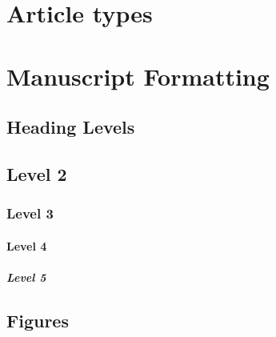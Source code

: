 \documentclass[utf8]{frontiersSCNS} %
\begin{document}
\section*{Article types}



\section{Manuscript Formatting}

\subsection{Heading Levels}


\subsection{Level 2}
\subsubsection{Level 3}
\paragraph{Level 4}
\subparagraph{Level 5}




\subsection{Figures}
\end{document}
